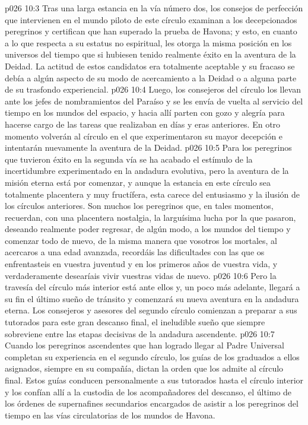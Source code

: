 \vs p026 10:3 Tras una larga estancia en la vía número dos, los consejos de perfección que intervienen en el mundo piloto de este círculo examinan a los decepcionados peregrinos y certifican que han superado la prueba de Havona; y esto, en cuanto a lo que respecta a su estatus no espiritual, les otorga la misma posición en los universos del tiempo que si hubiesen tenido realmente éxito en la aventura de la Deidad. La actitud de estos candidatos era totalmente aceptable y su fracaso se debía a algún aspecto de su modo de acercamiento a la Deidad o a alguna parte de su trasfondo experiencial.
\vs p026 10:4 Luego, los consejeros del círculo los llevan ante los jefes de nombramientos del Paraíso y se les envía de vuelta al servicio del tiempo en los mundos del espacio, y hacia allí parten con gozo y alegría para hacerse cargo de las tareas que realizaban en días y eras anteriores. En otro momento volverán al círculo en el que experimentaron su mayor decepción e intentarán nuevamente la aventura de la Deidad.
\vs p026 10:5 Para los peregrinos que tuvieron éxito en la segunda vía se ha acabado el estímulo de la incertidumbre experimentado en la andadura evolutiva, pero la aventura de la misión eterna está por comenzar, y aunque la estancia en este círculo sea totalmente placentera y muy fructífera, esta carece del entusiasmo y la ilusión de los círculos anteriores. Son muchos los peregrinos que, en tales momentos, recuerdan, con una placentera nostalgia, la larguísima lucha por la que pasaron, deseando realmente poder regresar, de algún modo, a los mundos del tiempo y comenzar todo de nuevo, de la misma manera que vosotros los mortales, al acercaros a una edad avanzada, recordáis las dificultades con las que os enfrentasteis en vuestra juventud y en los primeros años de vuestra vida, y verdaderamente desearíais vivir vuestras vidas de nuevo.
\vs p026 10:6 Pero la travesía del círculo más interior está ante ellos y, un poco más adelante, llegará a su fin el último sueño de tránsito y comenzará su nueva aventura en la andadura eterna. Los consejeros y asesores del segundo círculo comienzan a preparar a sus tutorados para este gran descanso final, el ineludible sueño que siempre sobreviene entre las etapas decisivas de la andadura ascendente.
\vs p026 10:7 Cuando los peregrinos ascendentes que han logrado llegar al Padre Universal completan su experiencia en el segundo círculo, los guías de los graduados a ellos asignados, siempre en su compañía, dictan la orden que los admite al círculo final. Estos guías conducen personalmente a sus tutorados hasta el círculo interior y los confían allí a la custodia de los acompañadores del descanso, el último de los órdenes de supernafines secundarios encargados de asistir a los peregrinos del tiempo en las vías circulatorias de los mundos de Havona.
